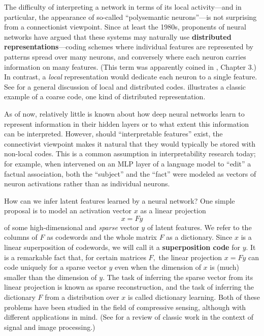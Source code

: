 The difficulty of interpreting a network in terms of its local activity---and in particular, the appearance of so-called ``polysemantic neurons''---is not surprising from a connectionist viewpoint. Since at least the 1980s, proponents of neural networks have argued that these systems may naturally use \textbf{distributed representations}---coding schemes where individual features are represented by patterns spread over many neurons, and conversely where each neuron carries information on many features. (This term was apparently coined in \cite{rumelhart_parallel_1986}, Chapter 3.) In contrast, a \textit{local} representation would dedicate each neuron to a single feature. See \cite{thorpe_local_1989} for a general discussion of local and distributed codes.  illustrates a classic example of a coarse code, one kind of distributed representation.

As of now, relatively little is known about how deep neural networks learn to represent information in their hidden layers or to what extent this information can be interpreted. However, should ``interpretable features'' exist, the connectivist viewpoint makes it natural that they would typically be stored with non-local codes. This is a common assumption in interpretability research today; for example, when \citet{meng_locating_2022} intervened on an MLP layer of a language model to ``edit'' a factual association, both the ``subject'' and the ``fact'' were modeled as vectors of neuron activations rather than as individual neurons.

How can we infer latent features learned by a neural network? One simple proposal is to model an activation vector $x$ as a linear projection
\begin{equation*}
	x = F y \label{eq:linear-model}
\end{equation*}
of some high-dimensional and \textit{sparse} vector $y$ of latent features. We refer to the columns of $F$ as codewords and the whole matrix $F$ as a dictionary. Since $x$ is a linear superposition of codewords, we will call it a \textbf{superposition code} for $y.$ It is a remarkable fact that, for certain matrices $F,$ the linear projection $x = F y$ can code uniquely for a sparse vector $y$ even when the dimension of $x$ is (much) smaller than the dimension of $y.$ The task of inferring the sparse vector from its linear projection is known as sparse reconstruction, and the task of inferring the dictionary $F$ from a distribution over $x$ is called dictionary learning. Both of these problems have been studied in the field of compressive sensing, although with different applications in mind. (See \cite{elad_sparse_2010} for a review of classic work in the context of signal and image processing.)

